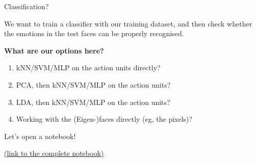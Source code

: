\documentclass[compress,xcolor=table]{beamer}
\begin{document}
\begin{frame}{Classification?}

    We want to train a classifier with our training dataset, and then check
    whether the emotions in the test faces can be properly recognised.

    \begin{center}
        {\bf What are our options here?}
    \end{center}

    \pause

    \begin{enumerate}
        \item<+-> kNN/SVM/MLP on the action units directly?
        \item<+-> PCA, then kNN/SVM/MLP on the action units?
        \item<+-> LDA, then kNN/SVM/MLP on the action units?
        \item<+-> Working with the (Eigen-)faces directly (eg, the pixels)?
    \end{enumerate}
\end{frame}

\begin{frame}[plain]
    \begin{center}
        {\Large Let's open a notebook!}
    \vspace{2em}

    \href{https://github.com/severin-lemaignan/lecture-hri-ml-for-hri/blob/master/dataset-emotions/Emotion 20classifier.ipynb}{(link
    to the complete notebook)}
    \end{center}
\end{frame}
\end{document}

